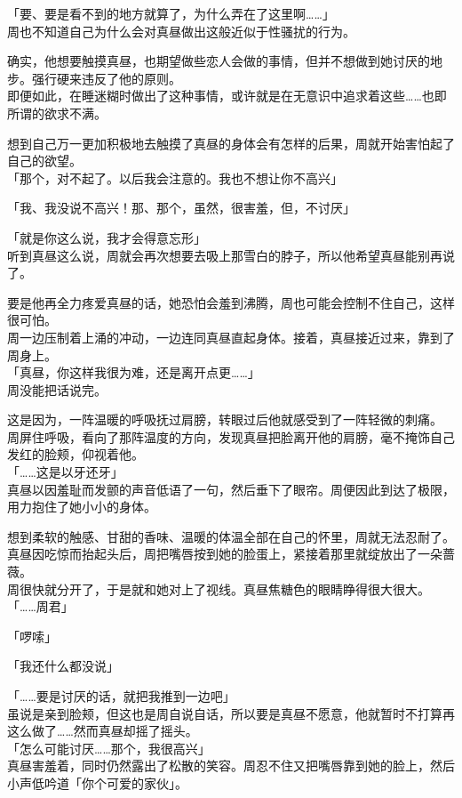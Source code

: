 「要、要是看不到的地方就算了，为什么弄在了这里啊……」\\

周也不知道自己为什么会对真昼做出这般近似于性骚扰的行为。

确实，他想要触摸真昼，也期望做些恋人会做的事情，但并不想做到她讨厌的地步。强行硬来违反了他的原则。\\

即便如此，在睡迷糊时做出了这种事情，或许就是在无意识中追求着这些……也即所谓的欲求不满。

想到自己万一更加积极地去触摸了真昼的身体会有怎样的后果，周就开始害怕起了自己的欲望。\\

「那个，对不起了。以后我会注意的。我也不想让你不高兴」

「我、我没说不高兴！那、那个，虽然，很害羞，但，不讨厌」

「就是你这么说，我才会得意忘形」\\

听到真昼这么说，周就会再次想要去吸上那雪白的脖子，所以他希望真昼能别再说了。

要是他再全力疼爱真昼的话，她恐怕会羞到沸腾，周也可能会控制不住自己，这样很可怕。\\

周一边压制着上涌的冲动，一边连同真昼直起身体。接着，真昼接近过来，靠到了周身上。\\

「真昼，你这样我很为难，还是离开点更……」\\

周没能把话说完。

这是因为，一阵温暖的呼吸抚过肩膀，转眼过后他就感受到了一阵轻微的刺痛。\\

周屏住呼吸，看向了那阵温度的方向，发现真昼把脸离开他的肩膀，毫不掩饰自己发红的脸颊，仰视着他。\\

「……这是以牙还牙」\\

真昼以因羞耻而发颤的声音低语了一句，然后垂下了眼帘。周便因此到达了极限，用力抱住了她小小的身体。

想到柔软的触感、甘甜的香味、温暖的体温全部在自己的怀里，周就无法忍耐了。\\

真昼因吃惊而抬起头后，周把嘴唇按到她的脸蛋上，紧接着那里就绽放出了一朵蔷薇。\\

周很快就分开了，于是就和她对上了视线。真昼焦糖色的眼睛睁得很大很大。\\

「……周君」

「啰嗦」

「我还什么都没说」

「……要是讨厌的话，就把我推到一边吧」\\

虽说是亲到脸颊，但这也是周自说自话，所以要是真昼不愿意，他就暂时不打算再这么做了……然而真昼却摇了摇头。\\

「怎么可能讨厌……那个，我很高兴」\\

真昼害羞着，同时仍然露出了松散的笑容。周忍不住又把嘴唇靠到她的脸上，然后小声低吟道「你个可爱的家伙」。
